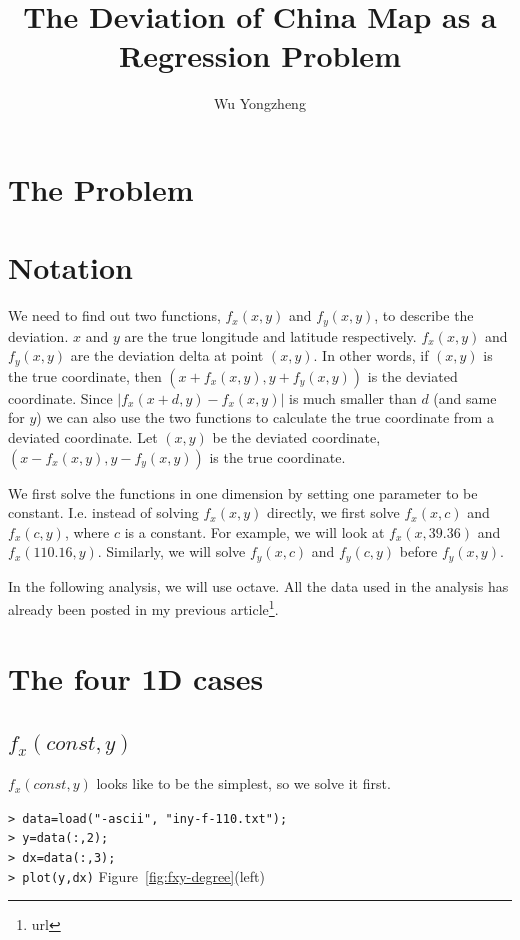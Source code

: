 \documentclass[a4paper]{article}
\begin{document}
\title{The Deviation of China Map as a Regression Problem}
\author{Wu Yongzheng}

\maketitle

\section{The Problem}

\section{Notation}
We need to find out two functions, $f_x(x,y)$ and $f_y(x,y)$, to describe the
deviation. $x$ and $y$ are the true longitude and latitude respectively.
$f_x(x,y)$ and $f_y(x,y)$ are the deviation delta at point $(x,y)$.
In other words, if $(x,y)$ is the true coordinate, then
$(x+f_x(x,y),y+f_y(x,y))$ is the deviated coordinate.
Since $|f_x(x+d,y)-f_x(x,y)|$ is much smaller than $d$ (and same for $y$)
we can also
use the two functions to calculate the true coordinate from a deviated
coordinate.
Let $(x,y)$ be the deviated coordinate, $(x-f_x(x,y),y-f_y(x,y))$ is the
true coordinate.

We first solve the functions in one dimension by setting one parameter to be
constant.
I.e. instead of solving $f_x(x,y)$ directly, we first solve $f_x(x,c)$
and $f_x(c,y)$, where $c$ is a constant.
For example, we will look at $f_x(x,39.36)$ and $f_x(110.16,y)$.
Similarly, we will solve $f_y(x,c)$ and $f_y(c,y)$ before $f_y(x,y)$.

In the following analysis, we will use octave.
All the data used in the analysis has already been posted in my previous
article\footnote{url}.

\section{The four 1D cases}
\subsection{$f_x(const,y)$}
$f_x(const,y)$ looks like to be the simplest, so we solve it first.

\noindent
\verb|> data=load("-ascii", "iny-f-110.txt");| \\
\verb|> y=data(:,2);| \\
\verb|> dx=data(:,3);| \\
\verb|> plot(y,dx)| \hfill Figure~\ref{fig:fxy-degree}(left)
\end{document}
